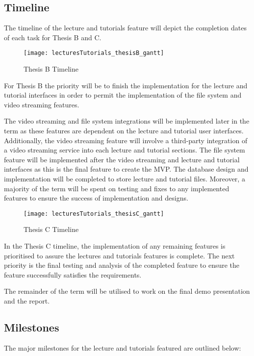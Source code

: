 \subsection{Timeline}
The timeline of the lecture and tutorials feature will depict the completion dates of each task for Thesis B and C.

\newpage

\begin{figure}[h!]
    \centering
    \texttt{[image: lecturesTutorials\_thesisB\_gantt]}
    \caption{Thesis B Timeline}
\end{figure}

For Thesis B the priority will be to finish the implementation for the lecture and tutorial interfaces in order to permit 
the implementation of the file system and video streaming features.

The video streaming and file system integrations will be implemented later in the term as these features are dependent on 
the lecture and tutorial user interfaces. Additionally, the video streaming feature will involve a third-party integration 
of a video streaming service into each lecture and tutorial sections. The file system feature will be implemented after the 
video streaming and lecture and tutorial interfaces as this is the final feature to create the MVP. The database design and 
implementation will be completed to store lecture and tutorial files. Moreover, a majority of the term will be spent on testing 
and fixes to any implemented features to ensure the success of implementation and designs.

\begin{figure}[h!]
    \centering
    \texttt{[image: lecturesTutorials\_thesisC\_gantt]}
    \caption{Thesis C Timeline}
\end{figure}

In the Thesis C timeline, the implementation of any remaining features is prioritised to assure the lectures and 
tutorials features is complete. The next priority is the final testing and analysis of the completed feature to 
ensure the feature successfully satisfies the requirements. 

The remainder of the term will be utilised to work on the final demo presentation and the report. 

\newpage
\subsection{Milestones}
The major milestones for the lecture and tutorials featured are outlined below:

